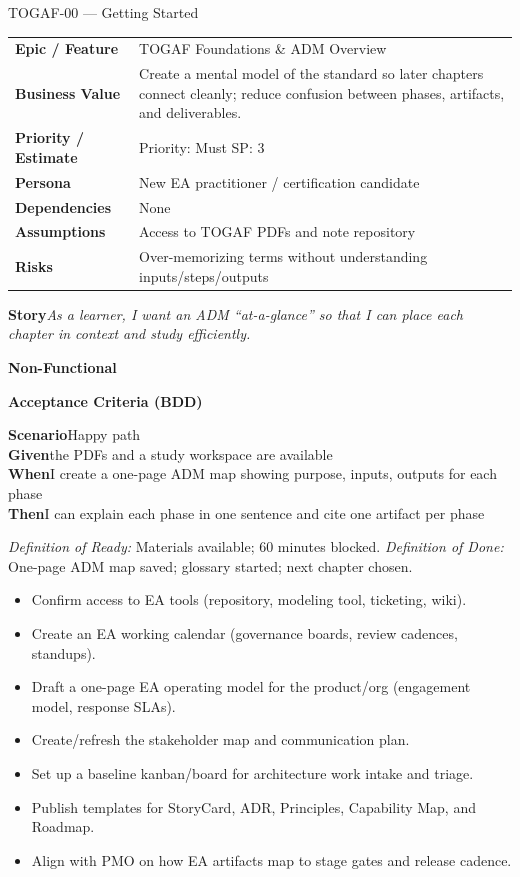 \documentclass[11pt,a4paper]{article}
\newcommand{\Tag}[1]{%
  \tcbox[
    on line, rounded corners,
    colback=chipback, colframe=chipborder,
    boxrule=0.3pt, left=5pt, right=5pt, top=2pt, bottom=2pt]{\footnotesize #1}%
}
\newcommand{\Field}[2]{\textbf{#1} & #2\\}
\newcommand{\StoryText}[1]{\textbf{Story}\quad \textit{#1}}
\newcommand{\NonFunctional}[1]{\textbf{Non-Functional}\quad #1}
\newcommand{\BDDHeader}{\textbf{Acceptance Criteria (BDD)}}
\newcommand{\BDDRow}[2]{\textbf{#1}\quad #2}
\newcommand{\DOR}[1]{\textit{\footnotesize Definition of Ready:} #1}
\newcommand{\DOD}[1]{\textit{\footnotesize Definition of Done:} #1}
\newcommand{\Task}[1]{\item[$\square$] #1}
\providecommand{\Field}[2]{\textbf{#1} & #2\\}
\begin{document}
\begin{StoryCard}{TOGAF-00 — Getting Started}
\begin{tabularx}{\textwidth}{L Y}
  \Field{Epic / Feature}{TOGAF Foundations \& ADM Overview}
  \Field{Business Value}{Create a mental model of the standard so later chapters connect cleanly; reduce confusion between phases, artifacts, and deliverables.}
  \Field{Priority / Estimate}{Priority: Must \quad\quad SP: 3}
  \Field{Persona}{New EA practitioner / certification candidate}
  \Field{Dependencies}{None}
  \Field{Assumptions}{Access to TOGAF PDFs and note repository}
  \Field{Risks}{Over-memorizing terms without understanding inputs/steps/outputs}
\end{tabularx}

\vspace{4pt}
\StoryText{As a learner, I want an ADM ``at-a-glance'' so that I can place each chapter in context and study efficiently.}

\vspace{2pt}
\NonFunctional{\Tag{Accuracy} \Tag{Clarity} \Tag{Traceability}}

\vspace{6pt}
\BDDHeader

\BDDRow{Scenario}{Happy path}\\
\BDDRow{Given}{the PDFs and a study workspace are available}\\
\BDDRow{When}{I create a one-page ADM map showing purpose, inputs, outputs for each phase}\\
\BDDRow{Then}{I can explain each phase in one sentence and cite one artifact per phase}

\vspace{6pt}
\DOR{Materials available; 60 minutes blocked.}\quad
\DOD{One-page ADM map saved; glossary started; next chapter chosen.}
\end{StoryCard}
\begin{TasksBox}
\begin{itemize}[label={}, leftmargin=*]
\Task{Confirm access to EA tools (repository, modeling tool, ticketing, wiki).}
\Task{Create an EA working calendar (governance boards, review cadences, standups).}
\Task{Draft a one-page EA operating model for the product/org (engagement model, response SLAs).}
\Task{Create/refresh the stakeholder map and communication plan.}
\Task{Set up a baseline kanban/board for architecture work intake and triage.}
\Task{Publish templates for StoryCard, ADR, Principles, Capability Map, and Roadmap.}
\Task{Align with PMO on how EA artifacts map to stage gates and release cadence.}
\end{itemize}
\end{TasksBox}
\end{document}
